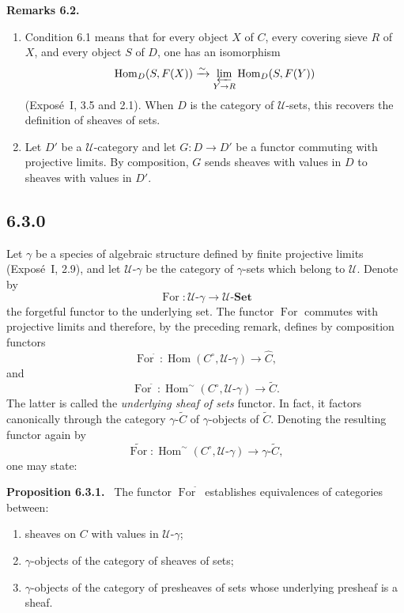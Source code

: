 \documentclass[11pt]{article}
\newcommand{\U}{\mathcal{U}}
\newcommand{\Set}{\mathbf{Set}}
\newcommand{\Hom}{\operatorname{Hom}}
\newenvironment{statement}[1]{\par\medskip\noindent\textbf{#1.}\ }{\par\medskip}
\newenvironment{remarktext}[1]{\par\medskip\noindent\textbf{#1.}\ }{\par\medskip}
\begin{document}
\begin{remarktext}{Remarks 6.2}
\begin{enumerate}[label=\arabic*)]
\item Condition 6.1 means that for every object \(X\) of \(C\), every covering sieve \(R\) of \(X\), and every object \(S\) of \(D\), one has an isomorphism
\[
\Hom_D(S,F(X))\xrightarrow{\sim}
\varprojlim_{Y\to R}\Hom_D(S,F(Y))
\]
(Expos\'e~I, 3.5 and 2.1). When \(D\) is the category of \(\U\)-sets, this recovers the definition of sheaves of sets.

\item Let \(D'\) be a \(\U\)-category and let \(G:D\to D'\) be a functor commuting with projective limits. By composition, \(G\) sends sheaves with values in \(D\) to sheaves with values in \(D'\).
\end{enumerate}
\end{remarktext}

\subsection*{6.3.0}
Let \(\gamma\) be a species of algebraic structure defined by finite projective limits (Expos\'e~I, 2.9), and let \(\U\)-\(\gamma\) be the category of \(\gamma\)-sets which belong to \(\U\). Denote by
\[
\operatorname{For}:\U\text{-}\gamma\to \U\text{-}\Set
\]
the forgetful functor to the underlying set. The functor \(\operatorname{For}\) commutes with projective limits and therefore, by the preceding remark, defines by composition functors
\[
\operatorname{For}^{\widehat{\phantom{,}}}:
\operatorname{Hom}(C^\circ,\U\text{-}\gamma)\longrightarrow \widehat C,
\]
and
\[
\operatorname{For}^{\widetilde{\phantom{,}}}:
\operatorname{Hom}^{\sim}(C^\circ,\U\text{-}\gamma)\longrightarrow \widetilde C.
\]
The latter is called the \emph{underlying sheaf of sets} functor. In fact, it factors canonically through the category \(\gamma\text{-}\widetilde C\) of \(\gamma\)-objects of \(\widetilde C\). Denoting the resulting functor again by
\[
\widetilde{\operatorname{For}}:
\operatorname{Hom}^{\sim}(C^\circ,\U\text{-}\gamma)\longrightarrow \gamma\text{-}\widetilde C,
\]
one may state:

\begin{statement}{Proposition 6.3.1}
The functor \(\operatorname{For}^{\widetilde{\phantom{,}}}\) establishes equivalences of categories between:
\begin{enumerate}[label=\arabic*)]
\item sheaves on \(C\) with values in \(\U\)-\(\gamma\);
\item \(\gamma\)-objects of the category of sheaves of sets;
\item \(\gamma\)-objects of the category of presheaves of sets whose underlying presheaf is a sheaf.
\end{enumerate}
\end{statement}
\end{document}
